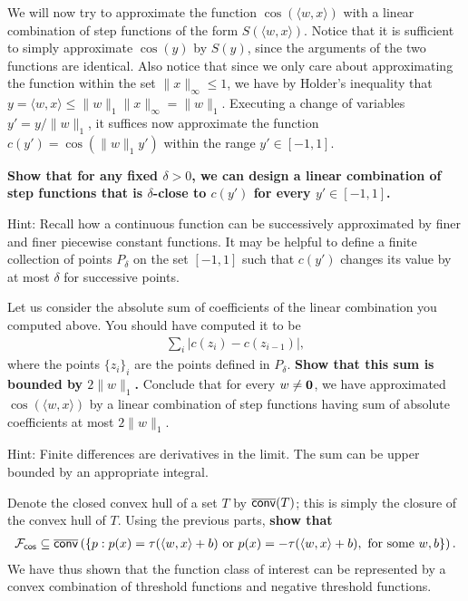 \begin{Parts}
\Part We will now try to approximate the function $\cos (\langle w, x \rangle)$ with a linear combination of step functions of the form $S( \langle w, x \rangle )$. Notice that it is sufficient to simply approximate $\cos(y)$ by $S(y)$, since the arguments of the two functions are identical. Also notice that since we only care about approximating the function within the set $\|x\|_\infty \leq 1$, we have by Holder's inequality that $y = \langle w, x \rangle \leq \|w\|_1 \|x\|_\infty = \|w\|_1$. Executing a change of variables $y' = y/ \|w\|_1$, it suffices now approximate the function $c(y') = \cos (\|w\|_1 y')$ within the range $y' \in [-1, 1]$.

{\bf Show that for any fixed $\delta > 0$, we can design a linear combination of step functions that is $\delta$-close to $c(y')$ for every $y' \in [-1, 1]$.}

Hint: Recall how a continuous function can be successively approximated by finer and finer piecewise constant functions. It may be helpful to define a finite collection of points $P_\delta$ on the set $[-1, 1]$ such that $c(y')$ changes its value by at most $\delta$ for successive points. 



\Part Let us consider the absolute sum of coefficients of the linear combination you computed above. You should have computed it to be 
\begin{align*}
\sum_i |c(z_i) - c(z_{i-1})|,
\end{align*}
where the points $\{z_i\}_{i}$ are the points defined in $P_\delta$. {\bf Show that this sum is bounded by $2 \|w\|_1$.} Conclude that for every $w \neq {\bf 0}$, we have approximated $\cos (\langle w, x \rangle)$ by a linear combination of step functions having sum of absolute coefficients at most $2 \|w\|_1$.

Hint: Finite differences are derivatives in the limit. The sum can be upper bounded by an appropriate integral.



\Part Denote the closed convex hull of a set $T$ by ${\sf \overline{conv}}(T)$; this is simply the closure of the convex hull of $T$. Using the previous parts, {\bf show that}
\begin{align*}
\mathcal{F}_{{\sf cos}} \subseteq {\sf \overline{conv}} \left( \{ p: p(x) = \tau(\langle w, x \rangle + b) \text{ or } p(x) = - \tau(\langle w, x \rangle + b), \text{ for some } w, b \} \right).
\end{align*} 
We have thus shown that the function class of interest can be represented by a convex combination of threshold functions and negative threshold functions.




\end{Parts}
